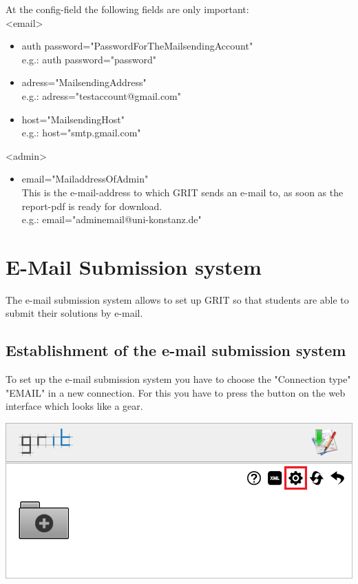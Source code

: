 \documentclass[10pt,a4paper, titlepage, toc=idx]{scrreprt}
\theoremstyle{definition}
\theoremstyle{plain}
\begin{document}
At the config-field the following fields are only important:\\
<email>
\begin{itemize}
\item auth password="PasswordForTheMailsendingAccount"\\
e.g.: auth password="password"

\item adress="MailsendingAddress"\\
e.g.: adress="testaccount@gmail.com"

\item host="MailsendingHost"\\
e.g.: host="smtp.gmail.com"
\end{itemize}
<admin>
\begin{itemize}
\item email="MailaddressOfAdmin"\\
This is the e-mail-address to which GRIT sends an e-mail to, as soon as the report-pdf is ready for download.\\
e.g.: email="adminemail@uni-konstanz.de"
\end{itemize}

\section{E-Mail Submission system}
The e-mail submission system allows to set up GRIT so that students are able to submit their solutions by e-mail.

\subsection*{Establishment of the e-mail submission system}
To set up the e-mail submission system you have to choose the "Connection type" "EMAIL" in a new connection. For this you have to press the button on the web interface which looks like a gear.
\begin{center}
\includegraphics[scale=0.55]{pictures/home_connection-marked.png} 
\end{center}
\end{document}
